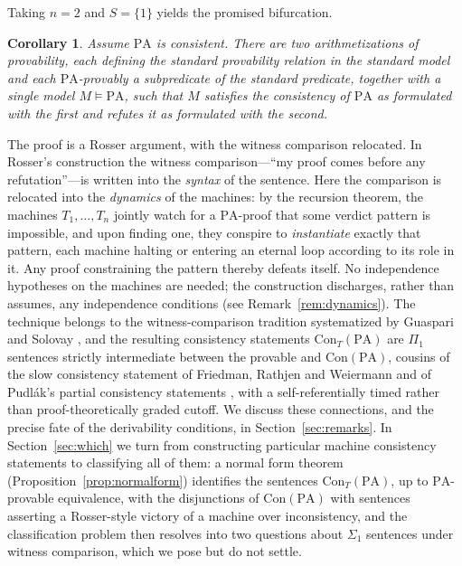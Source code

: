 \documentclass[11pt]{amsart}
\newtheorem{corollary}[theorem]{Corollary}
\theoremstyle{definition}
\theoremstyle{remark}
\newcommand{\PA}{\mathrm{PA}}
\newcommand{\Con}{\mathrm{Con}}
\begin{document}
Taking $n=2$ and $S=\{1\}$ yields the promised bifurcation.

\begin{corollary}\label{cor:two-minds-intro}
Assume $\PA$ is consistent. There are two arithmetizations of
provability, each defining the standard provability relation in the
standard model and each $\PA$-provably a subpredicate of the standard
predicate, together with a single model $M\models\PA$, such that $M$
satisfies the consistency of $\PA$ as formulated with the first and
refutes it as formulated with the second.
\end{corollary}

The proof is a Rosser argument, with the witness comparison relocated.
In Rosser's construction the witness comparison---``my proof comes before
any refutation''---is written into the \emph{syntax} of the sentence. Here
the comparison is relocated into the \emph{dynamics} of the machines: by
the recursion theorem, the machines $T_1,\dots,T_n$ jointly watch for a
$\PA$-proof that some verdict pattern is impossible, and upon finding one,
they conspire to \emph{instantiate} exactly that pattern, each machine
halting or entering an eternal loop according to its role in it. Any proof
constraining the pattern thereby defeats itself. No independence
hypotheses on the machines are needed; the construction discharges,
rather than assumes, any independence conditions (see Remark~\ref{rem:dynamics}). The technique
belongs to the witness-comparison tradition systematized by Guaspari and
Solovay \cite{GuaspariSolovay1979}, and the resulting consistency
statements $\Con_T(\PA)$ are $\Pi_1$ sentences strictly intermediate
between the provable and $\Con(\PA)$, cousins of the slow consistency
statement of Friedman, Rathjen and Weiermann \cite{FRW2013} and of
Pudl\'ak's partial consistency statements \cite{Pudlak1985}, with a
self-referentially timed rather than proof-theoretically graded cutoff.
We discuss these connections, and the precise fate of the derivability
conditions, in Section~\ref{sec:remarks}. In Section~\ref{sec:which} we
turn from constructing particular machine consistency statements to
classifying all of them: a normal form theorem
(Proposition~\ref{prop:normalform}) identifies the sentences $\Con_T(\PA)$,
up to $\PA$-provable equivalence, with the disjunctions of $\Con(\PA)$
with sentences asserting a Rosser-style victory of a machine over
inconsistency, and the classification problem then resolves into two
questions about $\Sigma_1$ sentences under witness comparison, which we
pose but do not settle.
\end{document}
